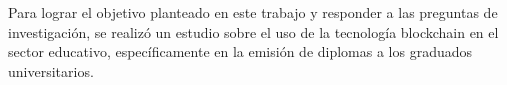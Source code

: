 



Para lograr el objetivo planteado en este trabajo y responder a las preguntas de investigación, se realizó un estudio sobre el uso de la tecnología blockchain en el sector educativo, específicamente en la emisión de diplomas a los graduados universitarios.

